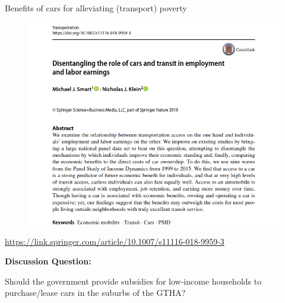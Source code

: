 \documentclass[aspectratio=169]{beamer}
\begin{document}
\begin{frame}
	
	Benefits of cars for alleviating (transport) poverty
	
	\begin{figure}
		\centering
		\includegraphics[width=0.64\linewidth]{images/klein_smart_cars.png}
	\end{figure}

	\tiny\url{https://link.springer.com/article/10.1007/s11116-018-9959-3}
	
\end{frame}







\begin{frame}
	
	\textbf{Discussion Question:}
	
	\vspace{2mm}
	
	Should the government provide subsidies for low-income households to purchase/lease cars in the suburbs of the GTHA?
	
\end{frame}
\end{document}
